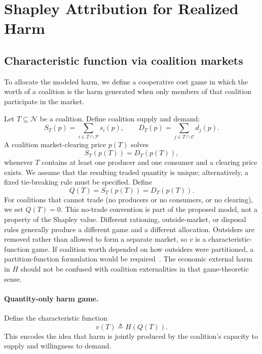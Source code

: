 \documentclass[journal, a4paper]{IEEEtran}
\begin{document}
\section{Shapley Attribution for Realized Harm}
\subsection{Characteristic function via coalition markets}
To allocate the modeled harm, we define a cooperative cost game in which the worth of a coalition is the harm generated when only members of that coalition participate in the market.

Let $T\subseteq \mathcal{N}$ be a coalition. Define coalition supply and demand:
\begin{equation}
S_T(p)=\sum_{i\in T\cap \mathcal{P}} s_i(p),\qquad
D_T(p)=\sum_{j\in T\cap \mathcal{C}} d_j(p).
\end{equation}
A coalition market-clearing price $p(T)$ solves
\begin{equation}
S_T(p(T))=D_T(p(T)),
\end{equation}
whenever $T$ contains at least one producer and one consumer and a clearing price exists. We assume that the resulting traded quantity is unique; alternatively, a fixed tie-breaking rule must be specified. Define
\begin{equation}
Q(T)=S_T(p(T))=D_T(p(T)).
\end{equation}
For coalitions that cannot trade (no producers or no consumers, or no clearing), we set $Q(T)=0$. This no-trade convention is part of the proposed model, not a property of the Shapley value. Different rationing, outside-market, or disposal rules generally produce a different game and a different allocation. Outsiders are removed rather than allowed to form a separate market, so $v$ is a characteristic-function game. If coalition worth depended on how outsiders were partitioned, a partition-function formulation would be required~\cite{ThrallLucas1963}. The economic external harm in $H$ should not be confused with coalition externalities in that game-theoretic sense.

\paragraph{Quantity-only harm game.}
Define the characteristic function
\begin{equation}
v(T)\triangleq H(Q(T)).
\label{eq:charfunc}
\end{equation}
This encodes the idea that harm is jointly produced by the coalition's capacity to supply and willingness to demand.
\end{document}
